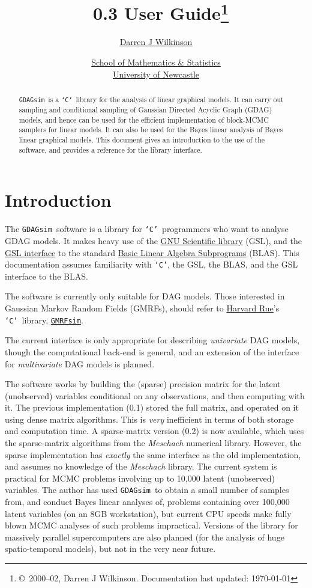\documentclass[12pt,a4paper]{article}
\title{\gds\ 0.3 User Guide\thanks{%
\copyright\ 2000--02, Darren J Wilkinson. Documentation last updated: \today
}}
\author{%
\href{http://www.staff.ncl.ac.uk/d.j.wilkinson/}{Darren J Wilkinson}}
\date{%
\href{http://www.ncl.ac.uk/math/}{School of Mathematics \& Statistics}\\
\href{http://www.ncl.ac.uk/}{University of Newcastle}
}
\newcommand{\gds}{\texttt{GDAGsim}}
\newcommand{\gmrfs}{\texttt{GMRFsim}}
\newcommand{\C}{\texttt{`C'}}
\begin{document}
\sffamily
\maketitle

\begin{abstract}
\gds\ is a \C\ library for the analysis of linear graphical models. It 
can carry out sampling and conditional sampling of Gaussian Directed
Acyclic Graph (GDAG) models, and hence can be used for the efficient
implementation of block-MCMC samplers for linear models. It can also
be used for the Bayes linear analysis of Bayes linear 
graphical models. This document gives an introduction to the use of
the software,
and provides a reference for the library interface.
\end{abstract}

\section{Introduction}

The \gds\ software is a library for \C\ programmers who want to
analyse GDAG models. It makes heavy use of the
\href{http://sourceware.cygnus.com/gsl/}{GNU Scientific library}
(GSL), and the
\href{http://sourceware.cygnus.com/gsl/ref/gsl-ref_7.html}{GSL
interface} to the standard
\href{http://www.netlib.org/cgi-bin/checkout/blast/blast.pl}{Basic
Linear Algebra Subprograms} (BLAS). This documentation assumes
familiarity with \C, the GSL, the BLAS, and the GSL interface to the
BLAS.

The software is currently only suitable for DAG models. Those
interested in Gaussian Markov Random Fields (GMRFs), should refer to
\href{http://www.math.ntnu.no/~hrue/index_eng.html}{Harvard 
Rue}'s \C\ library,
\href{http://www.math.ntnu.no/~hrue/GMRFsim/}{\gmrfs}.

The current interface is only appropriate for describing
\emph{univariate} DAG models, though the computational back-end is
general, and an extension of the interface for \emph{multivariate} DAG
models is planned.

The software works by building the (sparse) precision matrix for the
latent (unobserved) variables conditional on any observations, and
then computing with it. The previous implementation (0.1) stored the
full matrix, and operated on it using dense matrix algorithms. This is
\emph{very} inefficient in terms of both storage and computation
time. A sparse-matrix version (0.2) is now available, which uses the
sparse-matrix algorithms from the \emph{Meschach} numerical library.
However, the sparse implementation has \emph{exactly} the same
interface as the old implementation, and assumes no knowledge of the
\emph{Meschach} library. The current system is practical for MCMC problems
involving up to 10,000 latent (unobserved) variables. The author has
used \gds\ to obtain a small number of samples from, and conduct Bayes
linear analyses of, problems containing over 100,000 latent variables
(on an 8GB workstation), but current CPU speeds make fully blown MCMC
analyses of such problems impractical. Versions of the library for
massively parallel supercomputers are also planned (for the analysis
of huge spatio-temporal models), but not in the very near future.
\end{document}
